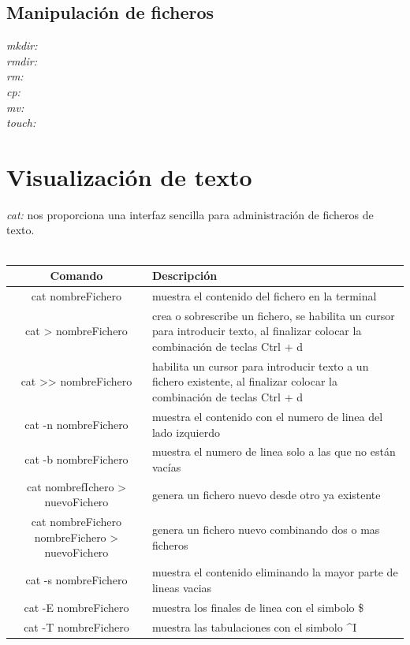 \documentclass[10pt,a4paper,titlepage]{article}
\begin{document}
	\subsection*{Manipulación de ficheros}
	\emph{mkdir:}
	\\
	\emph{rmdir:}
	\\
	\emph{rm:}
	\\
	\emph{cp:}
	\\
	\emph{mv:}
	\\
	\emph{touch:}
	
	\section*{Visualización de texto}
	\emph{cat:} nos proporciona una interfaz sencilla para administración de ficheros de texto.
	\\ 
	\\
	\begin{tabular}{|c|p{7cm}|}
		\hline
		Comando & Descripción \\
		\hline
		cat nombreFichero & muestra el contenido del fichero en la terminal \\
		\hline
		cat > nombreFichero & crea o sobrescribe un fichero, se habilita un cursor para introducir texto, al finalizar colocar la combinación de teclas Ctrl + d \\
		\hline
		cat >> nombreFichero & habilita un cursor para introducir texto a un fichero existente, al finalizar colocar la combinación de teclas Ctrl + d \\
		\hline
		cat -n nombreFichero & muestra el contenido con el numero de linea del lado izquierdo \\
		\hline
		cat -b nombreFichero & muestra el numero de linea solo a las que no están vacías \\
		\hline
		cat nombrefIchero > nuevoFichero & genera un fichero nuevo desde otro ya existente \\
		\hline
		cat nombreFichero nombreFichero > nuevoFichero & genera un fichero nuevo combinando dos o mas ficheros \\
		\hline
		cat -s nombreFichero & muestra el contenido eliminando la mayor parte de lineas vacias \\
		\hline
		cat -E nombreFichero & muestra los finales de linea con el simbolo \$ \\
		\hline
		cat -T nombreFichero & muestra las tabulaciones con el simbolo \textasciicircum I \\
		\hline
	\end{tabular}
\end{document}
